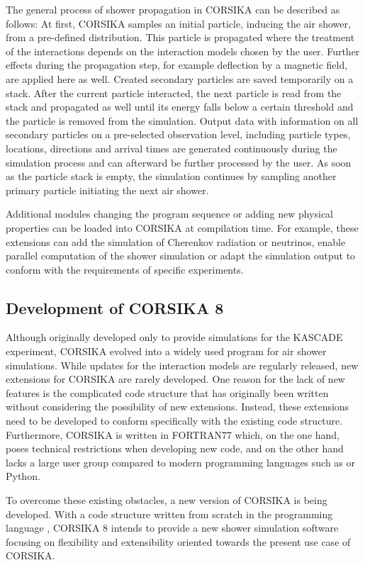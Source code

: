 The general process of shower propagation in CORSIKA can be described as follows:
At first, CORSIKA samples an initial particle, inducing the air shower, from a pre-defined distribution.
This particle is propagated where the treatment of the interactions depends on the interaction models chosen by the user.
Further effects during the propagation step, for example deflection by a magnetic field, are applied here as well.
Created secondary particles are saved temporarily on a stack.
After the current particle interacted, the next particle is read from the stack and propagated as well until its energy falls below a certain threshold and the particle is removed from the simulation.
Output data with information on all secondary particles on a pre-selected observation level, including particle types, locations, directions and arrival times are generated continuously during the simulation process and can afterward be further processed by the user.
As soon as the particle stack is empty, the simulation continues by sampling another primary particle initiating the next air shower.

Additional modules changing the program sequence or adding new physical properties can be loaded into CORSIKA at compilation time.
For example, these extensions can add the simulation of Cherenkov radiation or neutrinos, enable parallel computation of the shower simulation or adapt the simulation output to conform with the requirements of specific experiments.  

\subsection{Development of CORSIKA 8}

Although originally developed only to provide simulations for the KASCADE experiment, CORSIKA evolved into a widely used program for air shower simulations.
While updates for the interaction models are regularly released, new extensions for CORSIKA are rarely developed.
One reason for the lack of new features is the complicated code structure that has originally been written without considering the possibility of new extensions.
Instead, these extensions need to be developed to conform specifically with the existing code structure.
Furthermore, CORSIKA is written in FORTRAN77 which, on the one hand, poses technical restrictions when developing new code, and on the other hand lacks a large user group compared to modern programming languages such as \CC or Python.

To overcome these existing obstacles, a new version of CORSIKA is being developed.
With a code structure written from scratch in the programming language \CC, CORSIKA 8 intends to provide a new shower simulation software focusing on flexibility and extensibility oriented towards the present use case of CORSIKA.

